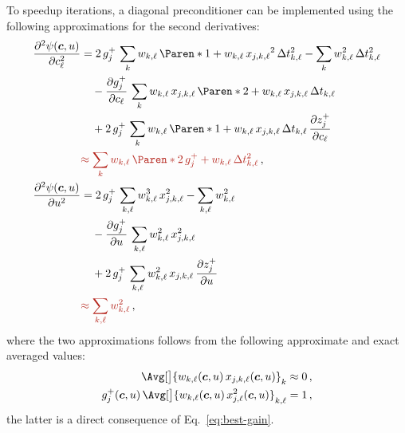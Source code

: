 \documentclass[a4paper,11pt,twoside]{scrartcl}
\newcommand{\oops}[1]{\textcolor[named]{BrickRed}{#1}}
\newcommand*{\delimsize}{}
\newcommand*{\SuchThat}{\:\delimsize\vert\:} %
\DeclareMathOperator*{\argmin}{arg\,min}
\newcommand*{\Set}[1]{\mathbb{#1}}
\newcommand*{\Reals}{\Set{R}}
\newcommand*{\Tag}[1]{\mathsf{#1}}
\newcommand*{\PDer}[2]{\frac{\partial#1}{\partial#2}}
\newcommand*{\estim}[1]{\widehat{#1}}
\newcommand*{\V}[1]{\boldsymbol{#1}}   %
\theoremstyle{plain} %
\theoremstyle{definition}
\theoremstyle{remark}
\begin{document}
To speedup iterations, a diagonal preconditioner can be implemented using the
following approximations for the second derivatives:
\begin{align}
  \PDer{^2\psi(\V c, u)}{c_{\ell}^2}
  &= 2\,g^+_j\,\sum_{k} w_{k,\ell}\,
    \Paren*{1 + w_{k,\ell}\,x_{j,k,\ell}}^2\,\Delta t_{k,\ell}^2
    - \sum_{k} w_{k,\ell}^2\,\Delta t_{k,\ell}^2
  \notag\\
  &\quad - \PDer{g^+_j}{c_\ell}\,\sum_{k} w_{k,\ell}\,x_{j,k,\ell}\,
  \Paren*{2 + w_{k,\ell}\,x_{j,k,\ell}}\,\Delta t_{k,\ell}
  \notag\\
  &\quad + 2\,g^+_j\,\sum_{k} w_{k,\ell}\,\Paren*{
    1 + w_{k,\ell}\,x_{j,k,\ell}
  }\,\Delta t_{k,\ell}\,\PDer{z^+_j}{c_\ell}
  \notag\\
  &\oops{
    \approx \sum_{k} w_{k,\ell}\,\Paren*{2\,g^+_j + w_{k,\ell}}
    \,\Delta t_{k,\ell}^2
  } \,,\\
  \PDer{^2\psi(\V c, u)}{u^2}
  &= 2\,g^+_j\,\sum_{k,\ell} w_{k,\ell}^3\,x_{j,k,\ell}^2
   - \sum_{k,\ell} w_{k,\ell}^2
  \notag\\
  &\quad - \PDer{g^+_j}{u}\,\sum_{k,\ell} w_{k,\ell}^2\,x_{j,k,\ell}^2
  \notag\\
  &\quad+ 2\,g^+_j\,\sum_{k,\ell} w_{k,\ell}^2\,x_{j,k,\ell}\,\PDer{z^+_j}{u}
  \notag\\
  &\oops{\approx \sum_{k,\ell} w_{k,\ell}^2} \,,
\end{align}
where the two approximations follows from the following approximate and exact
averaged values:
\begin{align*}
  \Avg[\big]{w_{k,\ell}(\V c, u)\,x_{j,k,\ell}(\V c, u)}_{k}
  &\approx 0 \,,\\
  g^+_j(\V c, u)\,\Avg[\big]{w_{k,\ell}(\V c, u)\,
    x_{j,\ell}^2(\V c, u)}_{k,\ell}
  &= 1\,,
\end{align*}
the latter is a direct consequence of Eq.~\eqref{eq:best-gain}.

\end{document}
